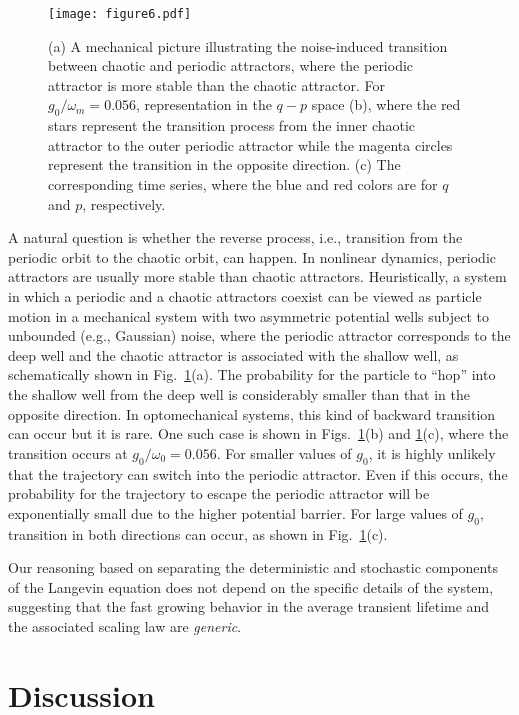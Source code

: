 \documentclass[12pt]{wlscirep}
\begin{document}
\begin{figure}
\centering
\texttt{[image: figure6.pdf]}
\caption{(a) A mechanical picture illustrating the noise-induced
transition between chaotic and periodic attractors, where the periodic
attractor is more stable than the chaotic attractor. For $g_0/\omega_m=0.056$,
representation in the $q-p$ space (b), where the red stars represent the
transition process from the inner chaotic attractor to the outer periodic
attractor while the magenta circles represent the transition in the opposite
direction. (c) The corresponding time series, where the blue and red colors
are for $q$ and $p$, respectively.}
\label{fig:backwardtran}
\end{figure}

A natural question is whether the reverse process, i.e., transition from the
periodic orbit to the chaotic orbit, can happen. In nonlinear dynamics, periodic
attractors are usually more stable than  chaotic attractors. Heuristically, a
system in which a periodic and a chaotic attractors coexist can be viewed as
particle motion in a mechanical system with two asymmetric potential wells
subject to unbounded (e.g., Gaussian) noise, where the periodic attractor
corresponds to the deep well and the chaotic attractor is associated with the
shallow well, as schematically shown in Fig.~\ref{fig:backwardtran}(a). The
probability for the particle to  ``hop'' into the shallow well from the deep
well is considerably smaller than that in the opposite direction. In
optomechanical systems, this kind of backward transition can occur but it is
rare. One such case is shown in Figs.~\ref{fig:backwardtran}(b) and
\ref{fig:backwardtran}(c), where the transition occurs at $g_0/\omega_0=0.056$.
For smaller values of $g_0$, it is highly unlikely that the trajectory can
switch into the periodic attractor. Even if this occurs, the probability for the
trajectory to escape the periodic attractor will be exponentially small due to
the higher potential barrier. For large values of $g_0$, transition in both
directions can occur, as shown in Fig.~\ref{fig:backwardtran}(c).

Our reasoning based on separating the deterministic and stochastic
components of the Langevin equation does not depend on the specific 
details of the system, suggesting that the fast growing behavior in 
the average transient lifetime and the associated scaling law are 
{\em generic}.  

\section*{Discussion}
\end{document}
